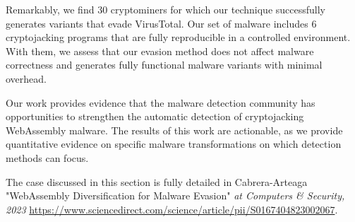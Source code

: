 





Remarkably, we find 30 cryptominers for which our technique successfully generates variants that evade VirusTotal.
Our set of malware includes 6 cryptojacking programs that are fully reproducible in a controlled environment. 
With them, we assess that our evasion method does not affect malware correctness and generates fully functional malware variants with minimal overhead.

Our work provides evidence that the malware detection community has opportunities to strengthen the automatic detection of cryptojacking WebAssembly malware. 
The results of this work are actionable, as we provide quantitative evidence on specific malware transformations on which detection methods can focus.


\begin{tcolorbox}[title=Contribution paper,boxrule=1pt,arc=.2em,boxsep=1.0mm]
    The case discussed in this section is fully detailed in Cabrera-Arteaga \etal "WebAssembly Diversification for Malware Evasion"
    \emph{at Computers \& Security, 2023}
    \url{https://www.sciencedirect.com/science/article/pii/S0167404823002067}. 
\end{tcolorbox}

